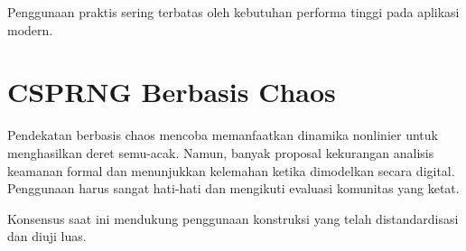\documentclass[../main.tex]{subfiles}
\begin{document}
Penggunaan praktis sering terbatas oleh kebutuhan performa tinggi pada aplikasi modern.

\section{CSPRNG Berbasis Chaos}
Pendekatan berbasis chaos mencoba memanfaatkan dinamika nonlinier untuk menghasilkan deret semu-acak. Namun, banyak proposal kekurangan analisis keamanan formal dan menunjukkan kelemahan ketika dimodelkan secara digital. Penggunaan harus sangat hati-hati dan mengikuti evaluasi komunitas yang ketat.

Konsensus saat ini mendukung penggunaan konstruksi yang telah distandardisasi dan diuji luas.
\end{document}
